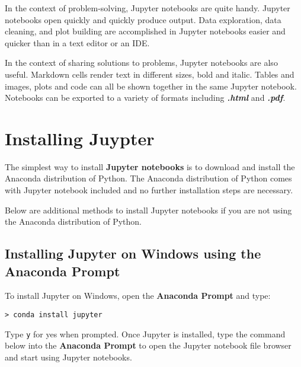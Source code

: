 \documentclass{book}
\newcommand{\passthrough}[1]{#1}
\begin{document}
    
        In the context of problem-solving, Jupyter notebooks are quite handy.
Jupyter notebooks open quickly and quickly produce output. Data
exploration, data cleaning, and plot building are accomplished in
Jupyter notebooks easier and quicker than in a text editor or an IDE.

In the context of sharing solutions to problems, Jupyter notebooks are
also useful. Markdown cells render text in different sizes, bold and
italic. Tables and images, plots and code can all be shown together in
the same Jupyter notebook. Notebooks can be exported to a variety of
formats including \textbf{\emph{.html}} and \textbf{\emph{.pdf}}.
    




    
        \hypertarget{installing-juypter}{%
\section{Installing Juypter}\label{installing-juypter}}
    




    
        The simplest way to install \textbf{Jupyter notebooks} is to download
and install the Anaconda distribution of Python. The Anaconda
distribution of Python comes with Jupyter notebook included and no
further installation steps are necessary.

Below are additional methods to install Jupyter notebooks if you are not
using the Anaconda distribution of Python.
    




    
        \hypertarget{installing-jupyter-on-windows-using-the-anaconda-prompt}{%
\subsection{Installing Jupyter on Windows using the Anaconda
Prompt}\label{installing-jupyter-on-windows-using-the-anaconda-prompt}}

To install Jupyter on Windows, open the \textbf{Anaconda Prompt} and
type:

\begin{lstlisting}
> conda install jupyter
\end{lstlisting}

Type \passthrough{\lstinline!y!} for yes when prompted. Once Jupyter is
installed, type the command below into the \textbf{Anaconda Prompt} to
open the Jupyter notebook file browser and start using Jupyter
notebooks.
\end{document}
